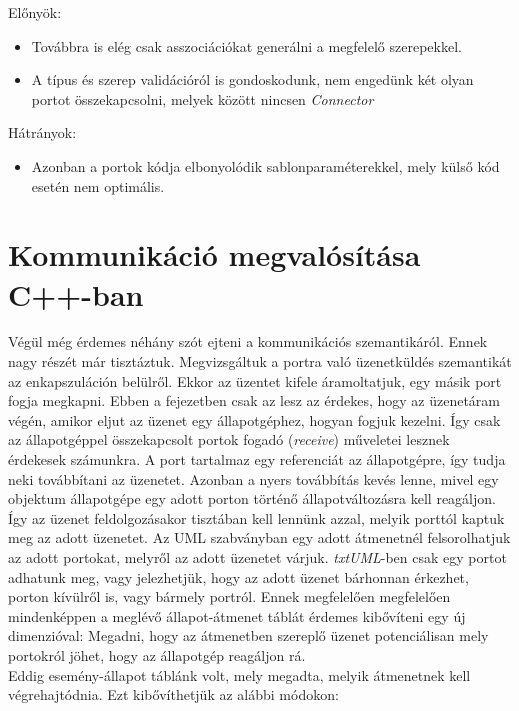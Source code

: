 \documentclass[a4paper,12pt]{report}
\begin{document}
\begin{enumerate}
Előnyök:
\begin{itemize}
\item Továbbra is elég csak asszociációkat generálni a megfelelő szerepekkel.
\item A típus és szerep validációról is gondoskodunk, nem engedünk két olyan portot összekapcsolni, melyek között nincsen \textit{Connector}
\end{itemize}
Hátrányok:
\begin{itemize}
\item Azonban a portok kódja elbonyolódik sablonparaméterekkel, mely külső kód esetén nem optimális.
\end{itemize}
\end{enumerate}

\section{Kommunikáció megvalósítása C++-ban}
Végül még érdemes néhány szót ejteni a kommunikációs szemantikáról. Ennek nagy részét már tisztáztuk. Megvizsgáltuk a portra való üzenetküldés szemantikát az enkapszuláción belülről. Ekkor az üzentet kifele áramoltatjuk, egy másik port fogja megkapni. Ebben a fejezetben csak az lesz az érdekes, hogy az üzenetáram végén, amikor eljut az üzenet egy állapotgéphez, hogyan fogjuk kezelni. Így csak az állapotgéppel összekapcsolt portok fogadó (\textit{receive}) műveletei lesznek érdekesek számunkra. A port tartalmaz egy referenciát az állapotgépre, így tudja neki továbbítani az üzenetet. Azonban a nyers továbbítás kevés lenne, mivel egy objektum állapotgépe egy adott porton történő állapotváltozásra kell reagáljon. Így az üzenet feldolgozásakor tisztában kell lennünk azzal, melyik porttól kaptuk meg az adott üzenetet. Az UML szabványban egy adott átmenetnél felsorolhatjuk az adott portokat, melyről az adott üzenetet várjuk. \textit{txtUML}-ben csak egy portot adhatunk meg, vagy jelezhetjük, hogy az adott üzenet bárhonnan érkezhet, porton kívülről is, vagy bármely portról. Ennek megfelelően megfelelően mindenképpen a meglévő állapot-átmenet táblát érdemes kibővíteni egy új dimenzióval: Megadni, hogy az átmenetben szereplő üzenet potenciálisan mely portokról jöhet, hogy az állapotgép reagáljon rá. \\
Eddig esemény-állapot táblánk volt, mely megadta, melyik átmenetnek kell végrehajtódnia. Ezt kibővíthetjük az alábbi módokon:
\end{document}
